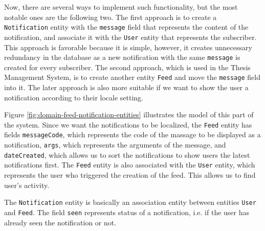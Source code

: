Now, there are several ways to implement such functionality, but the most notable ones are the following two. The first approach is to create a \texttt{Notification} entity with the \texttt{message} field that represents the content of the notification, and associate it with the \texttt{User} entity that represents the subscriber. This approach is favorable because it is simple, however, it creates unnecessary redundancy in the database as a new notification with the same \texttt{message} is created for every subscriber. The second approach, which is used in the Thesis Management System, is to create another entity \texttt{Feed} and move the \texttt{message} field into it. The later approach is also more suitable if we want to show the user a notification according to their locale setting. 

Figure \ref{fig:domain-feed-notification-entities} illustrates the model of this part of the system. Since we want the notifications to be localized, the \texttt{Feed} entity has fields \texttt{messageCode}, which represents the code of the massage to be displayed as a notification, \texttt{args}, which represents the arguments of the message, and \texttt{dateCreated}, which allows us to sort the notifications to show users the latest notifications first. The \texttt{Feed} entity is also associated with the \texttt{User} entity, which represents the user who triggered the creation of the feed. This allows us to find user's activity.

The \texttt{Notification} entity is basically an association entity between entities \texttt{User} and \texttt{Feed}. The field \texttt{seen} represents status of a notification, i.e. if the user has already seen the notification or not.

